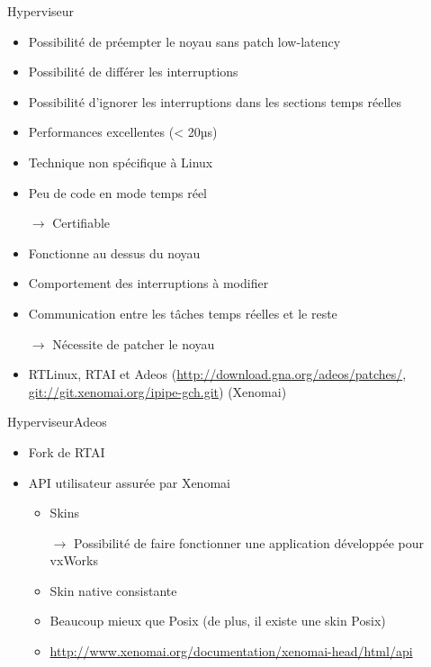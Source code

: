 \begin{frame}{Hyperviseur}
  \begin{itemize}
  \item Possibilité de préempter le noyau sans patch low-latency
  \item Possibilité de différer les interruptions
  \item  Possibilité  d'ignorer les  interruptions  dans les  sections
    temps réelles
  \item Performances excellentes (< 20µs)
  \item Technique non spécifique à Linux
  \item Peu de code en mode temps réel
  \item[$\to$] Certifiable

  \item Fonctionne au dessus du noyau
  \item Comportement des interruptions à modifier
  \item Communication entre les tâches temps réelles et le reste
  \item[$\to$] Nécessite de patcher le noyau
  \item           RTLinux,           RTAI           et           Adeos
    (\url{http://download.gna.org/adeos/patches/},
    \url{git://git.xenomai.org/ipipe-gch.git}) (Xenomai)
  \end{itemize}
\end{frame}

\begin{frame}{Hyperviseur}{Adeos}
  \begin{itemize}
    \item Fork de RTAI
    \item API utilisateur assurée par Xenomai
    \begin{itemize}
      \item Skins
      \item[$\to$]  Possibilité de  faire fonctionner  une application
        développée pour vxWorks
      \item Skin native consistante
      \item Beaucoup mieux que Posix (de plus, il existe une skin Posix)
      \item \url{http://www.xenomai.org/documentation/xenomai-head/html/api}
    \end{itemize}
  \end{itemize}
\end{frame}

